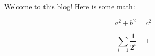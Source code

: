 \documentclass{article}
\begin{document}
    Welcome to this blog! Here is some math:

    \[
        a^2 + b^2 = c^2
    \]

    \[
        \sum_{i = 1} \frac{1}{2^i} = 1
    \]
\end{document}
